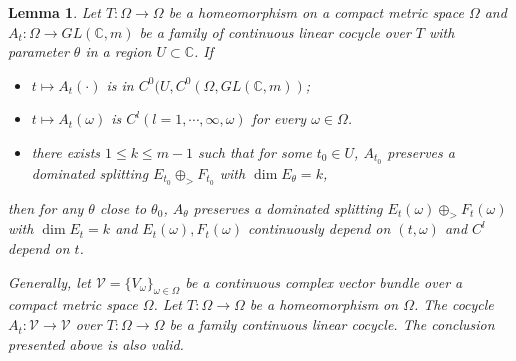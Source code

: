 \documentclass[11pt]{amsart}
\newtheorem{lemma}[theorem]{Lemma}
\theoremstyle{remark}
\theoremstyle{definition}
\newcommand{\C}{{\mathbf C}}
\newcommand{\V}{{\mathbf V}}
\def \C{{\mathcal{C}}}
\def \V{\mathcal{V}}
\def\C{{\mathbb C}}
\begin{document}
\begin{lemma}Let $T:\Omega\to \Omega$ be a homeomorphism on a compact metric space $\Omega$ and $A_t:\Omega\to GL(\C,m)$ be a family of continuous linear cocycle over $T$ with parameter $\theta$ in a region  $U\subset \C$. If \begin{itemize}
    \item $t\mapsto A_t(\cdot)$ is in $C^0(U, C^0(\Omega,GL(\C,m))$;
    \item $t \mapsto A_t(\omega)$ is $C^l(l=1,\cdots,\infty,\omega) $ for every $\omega\in \Omega$. 
    \item there exists $1\leq k\leq m-1$ such that for some $t_0\in U$, $A_{t_0}$ preserves a dominated splitting $E_{t_0}\oplus_{>} F_{t_0}$ with $\dim E_\theta=k$,
\end{itemize}
then for any $\theta$ close to $\theta_0$, $A_\theta$ preserves a dominated splitting  $E_t(\omega)\oplus_>F_t(\omega)$ with $\dim E_t=k$ and $E_t(\omega), F_t(\omega)$ continuously depend on $(t,\omega)$ and $C^l$ depend on $t$.

Generally, let $\mathcal V=\{V_\omega\}_{\omega\in \Omega}$ be a continuous complex vector bundle over a compact metric space $\Omega$. Let $T:\Omega\to \Omega$ be a homeomorphism on $\Omega$.
The cocycle $A_t:\V\to \V$ over $T:\Omega\to \Omega$ be a family continuous linear cocycle. The conclusion presented above is also valid.


\end{lemma}
\end{document}

